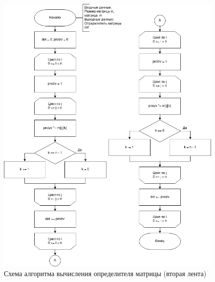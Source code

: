 \begin{figure}[H]
	\begin{center}
		\includegraphics[scale=0.6]{assets/det.png}
	\end{center}
	\caption{Схема алгоритма вычисления определителя матрицы (вторая лента)}
\end{figure}

